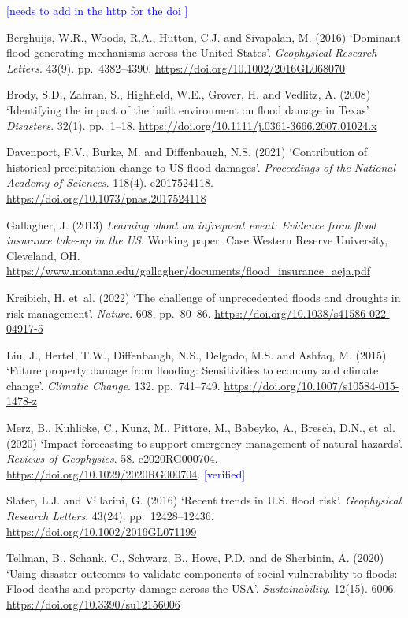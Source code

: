 \documentclass[10pt,twocolumn]{article}
\begin{document}
\textcolor{blue}{[needs to add in the http for the doi ]}
\begin{thebibliography}{}

Berghuijs, W.R., Woods, R.A., Hutton, C.J. and Sivapalan, M. (2016)
`Dominant flood generating mechanisms across the United States'.
\textit{Geophysical Research Letters}. 43(9). pp.~4382--4390. \url{https://doi.org/10.1002/2016GL068070}

Brody, S.D., Zahran, S., Highfield, W.E., Grover, H. and Vedlitz, A. (2008)
`Identifying the impact of the built environment on flood damage in Texas'.
\textit{Disasters}. 32(1). pp.~1--18. \url{ https://doi.org/10.1111/j.0361-3666.2007.01024.x}

Davenport, F.V., Burke, M. and Diffenbaugh, N.S. (2021)
`Contribution of historical precipitation change to US flood damages'.
\textit{Proceedings of the National Academy of Sciences}. 118(4). e2017524118. \url{https://doi.org/10.1073/pnas.2017524118}

Gallagher, J. (2013)
\textit{Learning about an infrequent event: Evidence from flood insurance take-up in the US}.
Working paper. Case Western Reserve University, Cleveland, OH. \url{https://www.montana.edu/gallagher/documents/flood_insurance_aeja.pdf}

Kreibich, H. et~al. (2022)
`The challenge of unprecedented floods and droughts in risk management'.
\textit{Nature}. 608. pp.~80--86. \url{https://doi.org/10.1038/s41586-022-04917-5}

Liu, J., Hertel, T.W., Diffenbaugh, N.S., Delgado, M.S. and Ashfaq, M. (2015)
`Future property damage from flooding: Sensitivities to economy and climate change'.
\textit{Climatic Change}. 132. pp.~741--749. \url{https://doi.org/10.1007/s10584-015-1478-z}

Merz, B., Kuhlicke, C., Kunz, M., Pittore, M., Babeyko, A., Bresch, D.N., et~al. (2020)
`Impact forecasting to support emergency management of natural hazards'.
\textit{Reviews of Geophysics}. 58. e2020RG000704. \url{https://doi.org/10.1029/2020RG000704}. \textcolor{blue}{[verified]}

Slater, L.J. and Villarini, G. (2016)
`Recent trends in U.S. flood risk'.
\textit{Geophysical Research Letters}. 43(24). pp.~12428--12436. \url{https://doi.org/10.1002/2016GL071199}

Tellman, B., Schank, C., Schwarz, B., Howe, P.D. and de Sherbinin, A. (2020)
`Using disaster outcomes to validate components of social vulnerability to floods: Flood deaths and property damage across the USA'.
\textit{Sustainability}. 12(15). 6006. \url{https://doi.org/10.3390/su12156006}

\end{thebibliography}
\end{document}
